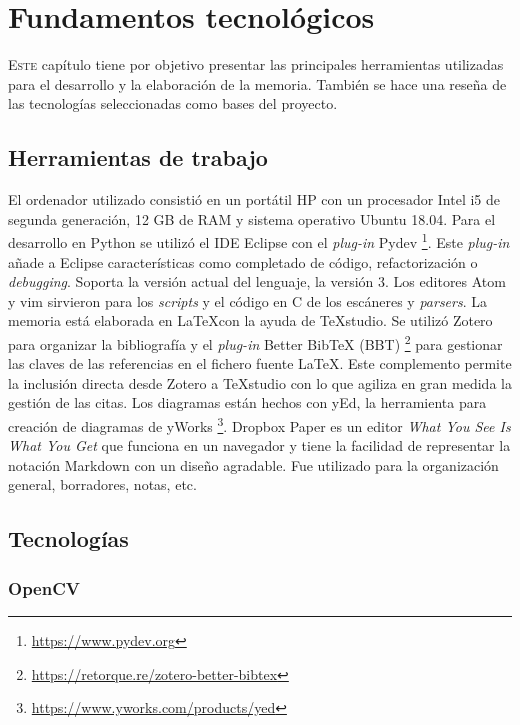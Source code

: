 
\chapter{Fundamentos tecnológicos}
\label{chap:fundamentos-tecnologicos}

\lettrine{E}{ste} capítulo tiene por objetivo presentar las principales herramientas utilizadas para el desarrollo y la elaboración de la memoria. También se hace una reseña de las tecnologías seleccionadas como bases del proyecto.

\section{Herramientas de trabajo}

El ordenador utilizado consistió en un portátil HP con un procesador Intel i5 de segunda generación, 12 GB de RAM y sistema operativo Ubuntu 18.04. Para el desarrollo en Python se utilizó el IDE Eclipse con el \emph{plug-in} Pydev
\footnote{\url{https://www.pydev.org}}. Este \emph{plug-in} añade a Eclipse características como completado de código, refactorización o \emph{debugging}. Soporta la versión actual del lenguaje, la versión 3. Los editores Atom y vim sirvieron para los \emph{scripts} y el código en C de los escáneres y \emph{parsers}. La memoria está elaborada en \LaTeX con la ayuda de TeXstudio. Se utilizó Zotero para organizar la bibliografía y el \emph{plug-in} Better BibTeX (BBT) 
\footnote{\url{https://retorque.re/zotero-better-bibtex}} para gestionar las claves de las referencias en el fichero fuente \LaTeX. Este complemento permite la inclusión directa desde Zotero a TeXstudio con lo que agiliza en gran medida la gestión de las citas. Los diagramas están hechos con yEd, la herramienta para creación de diagramas de yWorks 
\footnote{\url{https://www.yworks.com/products/yed}}. Dropbox Paper es un editor \emph{What You See Is What You Get} que funciona en un navegador y tiene la facilidad de representar la notación Markdown con un diseño agradable. Fue utilizado para la organización general, borradores, notas, etc.

\section{Tecnologías}

\subsection{OpenCV}

